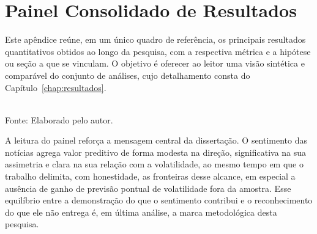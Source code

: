 \chapter{Painel Consolidado de Resultados} \label{ap:painel}

Este apêndice reúne, em um único quadro de referência, os principais resultados quantitativos obtidos ao longo da pesquisa, com a respectiva métrica e a hipótese ou seção a que se vinculam. O objetivo é oferecer ao leitor uma visão sintética e comparável do conjunto de análises, cujo detalhamento consta do Capítulo~\ref{chap:resultados}.

\begin{table}[htpb]
\centering
\caption{Painel consolidado dos resultados da pesquisa.}
\label{tab:painel}
\vspace{0.2cm}
{\small \\ Fonte: Elaborado pelo autor.}
\end{table}

A leitura do painel reforça a mensagem central da dissertação. O sentimento das notícias agrega valor preditivo de forma modesta na direção, significativa na sua assimetria e clara na sua relação com a volatilidade, ao mesmo tempo em que o trabalho delimita, com honestidade, as fronteiras desse alcance, em especial a ausência de ganho de previsão pontual de volatilidade fora da amostra. Esse equilíbrio entre a demonstração do que o sentimento contribui e o reconhecimento do que ele não entrega é, em última análise, a marca metodológica desta pesquisa.
